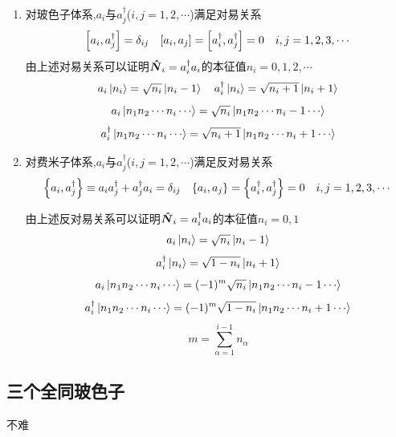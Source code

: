 \begin{formal}
\begin{enumerate}
            \item 对玻色子体系,$a_{i}$与$a_{j}^{\dagger}$($i,j=1,2,\cdots$)满足对易关系
                  $$ 
                  \comm{a_{i}}{a_{j}^{\dagger}} = \delta_{ij} \quad 
                  \comm{a_{i}}{a_{j}} = \comm{a_{i}^{\dagger}}{a_{j}^{\dagger}} = 0 \quad i,j=1,2,3,\cdots
                  $$
                  由上述对易关系可以证明$\vu*{N}_{i} = a_{i}^{\dagger} a_{i} $的本征值$n_{i} = 0,1,2,\cdots$
                  $$ a_{i} \ket{n_{i}} = \sqrt{n_{i}} \ket{n_{i} - 1} \quad a_{i}^{\dagger} \ket{n_{i}} = \sqrt{n_{i}+1} \ket{n_{i} + 1} $$
                  $$ a_{i} \ket{n_{1}n_{2}\cdots n_{i}\cdots}  = \sqrt{n_{i}} \ket{n_{1}n_{2}\cdots n_{i}-1 \cdots} $$
                  $$ a_{i}^{\dagger} \ket{n_{1}n_{2}\cdots n_{i}\cdots}  = \sqrt{n_{i}+1} \ket{n_{1}n_{2}\cdots n_{i}+1 \cdots} $$

            \item 对费米子体系,$a_{i}$与$a_{j}^{\dagger}$($i,j=1,2,\cdots$)满足反对易关系
                  $$ 
                  \qty{ a_{i},a_{j}^{\dagger}} \equiv a_{i} a_{j}^{\dagger} + a_{j}^{\dagger} a_{i} = \delta_{ij} \quad 
                  \qty{a_{i},a_{j}} =  \qty{a_{i}^{\dagger},a_{j}^{\dagger}} = 0 \quad 
                  i,j=1,2,3,\cdots
                  $$

                  由上述反对易关系可以证明$\vu*{N}_{i} = a_{i}^{\dagger} a_{i} $的本征值$n_{i} = 0,1$
                  $$
                  a_{i} \ket{n_{i}} = \sqrt{n_{i}} \ket{n_{i} - 1}
                  $$
                  $$
                  a_{i}^{\dagger} \ket{n_{i}} = \sqrt{1-n_{i}} \ket{n_{i} + 1}
                  $$
                  $$
                  a_{i} \ket{n_{1}n_{2}\cdots n_{i}\cdots}  = (-1)^{m} \sqrt{n_{i}} \ket{n_{1}n_{2}\cdots n_{i} - 1 \cdots} 
                  $$
                  $$
                  a_{i}^{\dagger} \ket{n_{1}n_{2}\cdots n_{i}\cdots}  = (-1)^{m} \sqrt{1 - n_{i}} \ket{n_{1}n_{2}\cdots n_{i} + 1 \cdots} 
                  $$
                  $$
                  m = \sum\limits_{\alpha=1}^{i-1} n_{\alpha}
                  $$
        \end{enumerate}
        \end{formal}

        \subsection{三个全同玻色子}
            不难

